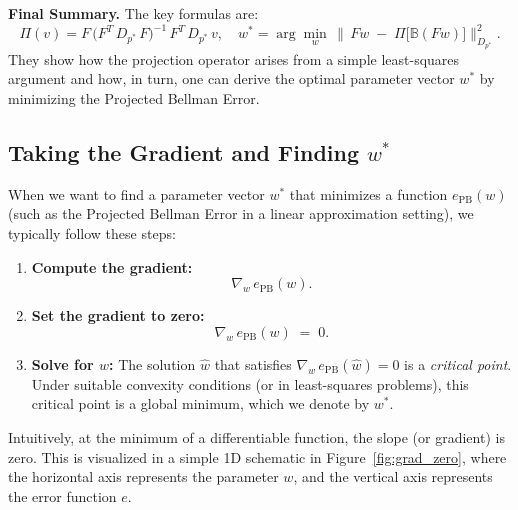 \noindent
\textbf{Final Summary.}  
The key formulas are:
\[
\boxed{
\Pi(v) 
= 
F \,\bigl(F^T\,D_{p^*}\,F\bigr)^{-1}\,F^T\,D_{p^*}\,v,
\quad
w^*
= 
\arg\min_{w}\,
\bigl\|\,
F w
\;-\;
\Pi\bigl[\mathbb{B}(F w)\bigr]
\bigr\|_{D_{p^*}}^2.
}
\]
They show how the projection operator arises from a simple least-squares argument and how, in turn, one can derive the optimal parameter vector $w^*$ by minimizing the Projected Bellman Error.

\subsection{Taking the Gradient and Finding \texorpdfstring{$w^*$}{w*}}

When we want to find a parameter vector \(w^*\) that minimizes a function \(e_{\mathrm{PB}}(w)\)
(such as the Projected Bellman Error in a linear approximation setting), we typically follow these steps:

\begin{enumerate}
    \item \textbf{Compute the gradient:} 
    \[
    \nabla_w \, e_{\mathrm{PB}}(w).
    \]
    \item \textbf{Set the gradient to zero:} 
    \[
    \nabla_w \, e_{\mathrm{PB}}(w) \;=\; 0.
    \]
    \item \textbf{Solve for \(w\):} 
    The solution \(\widehat{w}\) that satisfies \(\nabla_w \, e_{\mathrm{PB}}(\widehat{w}) = 0\)
    is a \emph{critical point}. Under suitable convexity conditions (or in least-squares problems),
    this critical point is a global minimum, which we denote by \(w^*\).
\end{enumerate}

Intuitively, at the minimum of a differentiable function, the slope (or gradient) is zero. This is
visualized in a simple 1D schematic in Figure~\ref{fig:grad_zero}, where the horizontal axis 
represents the parameter \(w\), and the vertical axis represents the error function \(e\). 

